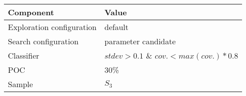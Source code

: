 \begin{tabular}{ll}
\hline
Component                    & Value         \\
\hline
Exploration configuration   & default       \\
Search configuration        & parameter candidate          \\
Classifier                  & $stdev > 0.1$ \& $cov. < max(cov.) * 0.8$  \\
POC                         & 30\%          \\
Sample                      & $S_3$         \\
\hline
\end{tabular}